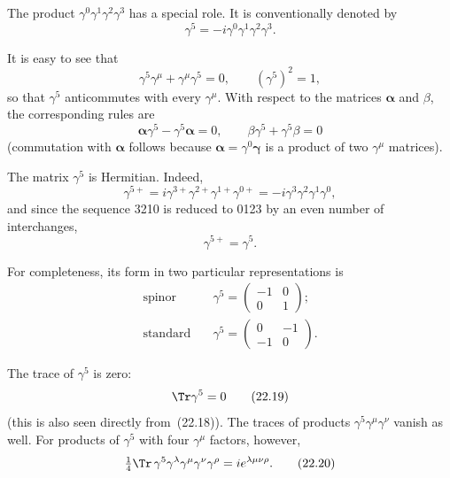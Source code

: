 The product $\gamma^0\gamma^1\gamma^2\gamma^3$ has a special role. It is conventionally denoted by
\begin{equation}
\gamma^5 = -i\gamma^0\gamma^1\gamma^2\gamma^3.
\tag{22.14}
\end{equation}

It is easy to see that
\begin{equation}
\gamma^5\gamma^\mu + \gamma^\mu\gamma^5 = 0,\qquad (\gamma^5)^2 = 1,
\tag{22.15}
\end{equation}
so that $\gamma^5$ anticommutes with every $\gamma^\mu$. With respect to the matrices $\boldsymbol{\alpha}$ and $\beta$, the corresponding rules are
\begin{equation}
\boldsymbol{\alpha}\gamma^5 - \gamma^5\boldsymbol{\alpha} = 0,\qquad \beta\gamma^5 + \gamma^5\beta = 0
\tag{22.16}
\end{equation}
(commutation with $\boldsymbol{\alpha}$ follows because $\boldsymbol{\alpha} = \gamma^0\boldsymbol{\gamma}$ is a product of two $\gamma^\mu$ matrices).

The matrix $\gamma^5$ is Hermitian. Indeed,
\[
\gamma^{5+} = i\gamma^{3+}\gamma^{2+}\gamma^{1+}\gamma^{0+} = -i\gamma^3\gamma^2\gamma^1\gamma^0,
\]
and since the sequence 3210 is reduced to 0123 by an even number of interchanges,
\begin{equation}
\gamma^{5+} = \gamma^5.
\tag{22.17}
\end{equation}

For completeness, its form in two particular representations is
\begin{equation}
\begin{aligned}
\text{spinor}
\quad &\gamma^5 = \begin{pmatrix} -1 & 0\\ 0 & 1 \end{pmatrix};\\
\text{standard}
\quad &\gamma^5 = \begin{pmatrix} 0 & -1\\ -1 & 0 \end{pmatrix}.
\end{aligned}
\tag{22.18}
\end{equation}

The trace of $\gamma^5$ is zero:
\begin{equation}
\Tr\gamma^5 = 0
\tag{22.19}
\end{equation}
(this is also seen directly from~(22.18)). The traces of products $\gamma^5\gamma^\mu\gamma^\nu$ vanish as well. For products of $\gamma^5$ with four $\gamma^\mu$ factors, however,
\begin{equation}
\tfrac{1}{4}\Tr\,\gamma^5\gamma^\lambda\gamma^\mu\gamma^\nu\gamma^\rho = ie^{\lambda\mu\nu\rho}.
\tag{22.20}
\end{equation}

